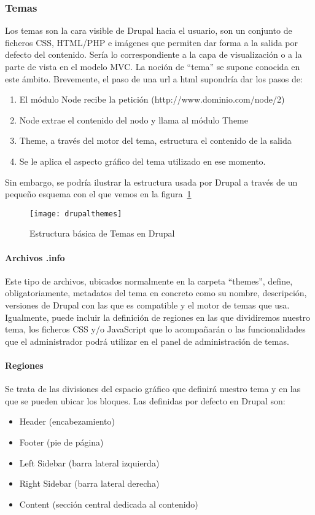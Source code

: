 \subsubsection{Temas}
\par Los temas son la cara visible de Drupal hacia el usuario, son un conjunto de ficheros CSS, HTML/PHP e imágenes que permiten dar forma a la salida por defecto del contenido. Sería lo correspondiente a la capa de visualización o a la parte de vista en el modelo MVC. La noción de ``tema'' se supone conocida en este ámbito. Brevemente, el paso de una url a html supondría dar los pasos de:
\begin{enumerate}
\item El módulo Node recibe la petición (http://www.dominio.com/node/2)
\item Node extrae el contenido del nodo y llama al módulo Theme
\item Theme, a través del motor del tema, estructura el contenido de la salida
\item Se le aplica el aspecto gráfico del tema utilizado en ese momento.
\end{enumerate}

\par Sin embargo, se podría ilustrar la estructura usada por Drupal a través de un pequeño esquema con el que vemos en la figura~\ref{fig:drupalthemes}
\begin{figure}
\centering
\texttt{[image: drupalthemes]}
\caption{Estructura básica de Temas en Drupal\cite{references:drupalthemes}}
\label{fig:drupalthemes}
\end{figure}


\paragraph{Archivos .info}
\par Este tipo de archivos, ubicados normalmente en la carpeta ``themes'', define, obligatoriamente, metadatos del tema en concreto como su nombre, descripción, versiones de Drupal con las que es compatible y el motor de temas que usa. Igualmente, puede incluir la definición de regiones en las que dividiremos nuestro tema, los ficheros CSS y/o JavaScript que lo acompañarán o las funcionalidades que el administrador podrá utilizar en el panel de administración de temas.

\paragraph{Regiones}
\par Se trata de las divisiones del espacio gráfico que definirá nuestro tema y en las que se pueden ubicar los bloques. Las definidas por defecto en Drupal son:
\begin{itemize}
\item Header (encabezamiento)
\item Footer (pie de página)
\item Left Sidebar (barra lateral izquierda)
\item Right Sidebar (barra lateral derecha)
\item Content (sección central dedicada al contenido)
\end{itemize}

